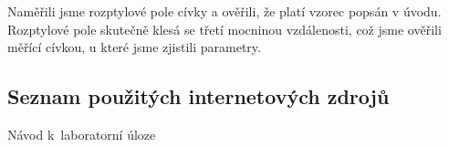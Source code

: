 \documentclass[a4paper,12pt]{article}   %
\begin{document}


Naměřili jsme rozptylové pole cívky a ověřili, že platí vzorec popsán v úvodu. Rozptylové pole skutečně klesá se třetí mocninou vzdálenosti, což jsme ověřili měřící cívkou, u které jsme zjistili parametry. 



\clearpage
\renewcommand{\refname}{Seznam použité literatury a~zdrojů informací} 

\begin{thebibliography}{99}

\subsection*{Seznam použitých internetových zdrojů}
     Návod k~laboratorní úloze
    
\end{thebibliography}
\end{document}
